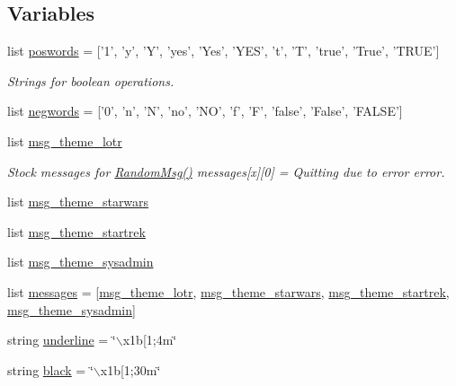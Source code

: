 \subsection*{\-Variables}
\begin{DoxyCompactItemize}
\item 
list \hyperlink{namespaceutils_a2b1e85a9f2279ea635c53853c81ce829}{poswords} = \mbox{[}'1', 'y', '\-Y', 'yes', '\-Yes', '\-Y\-E\-S', 't', '\-T', 'true', '\-True', '\-T\-R\-U\-E'\mbox{]}
\begin{DoxyCompactList}\small\item\em \-Strings for boolean operations. \end{DoxyCompactList}\item 
list \hyperlink{namespaceutils_ac5349eff7e6e2f70d80d31ece6d91b0d}{negwords} = \mbox{[}'0', 'n', '\-N', 'no', '\-N\-O', 'f', '\-F', 'false', '\-False', '\-F\-A\-L\-S\-E'\mbox{]}
\item 
list \hyperlink{namespaceutils_a5d8a2a3ac46fbc8e7280b92c7e958fb1}{msg\-\_\-theme\-\_\-lotr}
\begin{DoxyCompactList}\small\item\em \-Stock messages for \hyperlink{namespaceutils_a17b230eb88f99a55015827768f6d5c6e}{\-Random\-Msg()} messages\mbox{[}x\mbox{]}\mbox{[}0\mbox{]} = \-Quitting due to error error. \end{DoxyCompactList}\item 
list \hyperlink{namespaceutils_aae71d893a1a1f36409c41ce9f00c39d0}{msg\-\_\-theme\-\_\-starwars}
\item 
list \hyperlink{namespaceutils_a539e6ad28cc48419af0d7577e82852ed}{msg\-\_\-theme\-\_\-startrek}
\item 
list \hyperlink{namespaceutils_ae43b30d88f664df16499f8abb60e0c12}{msg\-\_\-theme\-\_\-sysadmin}
\item 
list \hyperlink{namespaceutils_ac2d8fb5f5c3b7e5519dc8d06afb69703}{messages} = \mbox{[}\hyperlink{namespaceutils_a5d8a2a3ac46fbc8e7280b92c7e958fb1}{msg\-\_\-theme\-\_\-lotr}, \hyperlink{namespaceutils_aae71d893a1a1f36409c41ce9f00c39d0}{msg\-\_\-theme\-\_\-starwars}, \hyperlink{namespaceutils_a539e6ad28cc48419af0d7577e82852ed}{msg\-\_\-theme\-\_\-startrek}, \hyperlink{namespaceutils_ae43b30d88f664df16499f8abb60e0c12}{msg\-\_\-theme\-\_\-sysadmin}\mbox{]}
\item 
string \hyperlink{namespaceutils_a2ea7e499efc5c857f8f2758453217829}{underline} = \char`\"{}$\backslash$x1b\mbox{[}1;4m\char`\"{}
\item 
string \hyperlink{namespaceutils_abc82b697db81e567498bcbe13f0e779c}{black} = \char`\"{}$\backslash$x1b\mbox{[}1;30m\char`\"{}

\end{DoxyCompactItemize}
